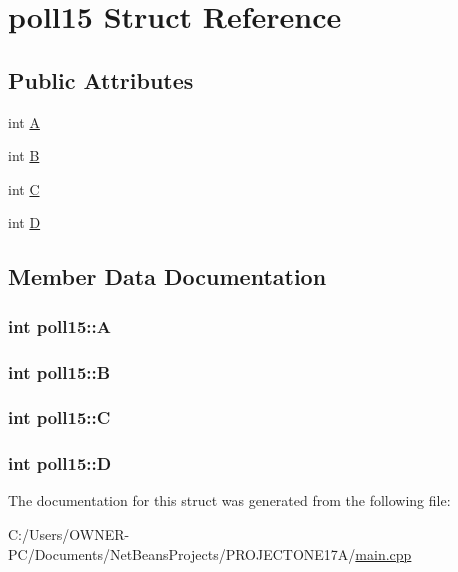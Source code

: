 \hypertarget{structpoll15}{\section{poll15 Struct Reference}
\label{structpoll15}
}
\subsection*{Public Attributes}
\begin{DoxyCompactItemize}
\item 
int \hyperlink{structpoll15_afdb28315d0d491657a2ec84be74b134f}{A}
\item 
int \hyperlink{structpoll15_a64d2ca7b5777950cc990f1be90099f97}{B}
\item 
int \hyperlink{structpoll15_a48a941327e68f8256c88a8a63f8e4632}{C}
\item 
int \hyperlink{structpoll15_a20b85e236d485c7014e6bc8bd4066d0b}{D}
\end{DoxyCompactItemize}


\subsection{Member Data Documentation}
\hypertarget{structpoll15_afdb28315d0d491657a2ec84be74b134f}{
\subsubsection[{A}]{\setlength{\rightskip}{0pt plus 5cm}int poll15\+::\+A}}\label{structpoll15_afdb28315d0d491657a2ec84be74b134f}
\hypertarget{structpoll15_a64d2ca7b5777950cc990f1be90099f97}{
\subsubsection[{B}]{\setlength{\rightskip}{0pt plus 5cm}int poll15\+::\+B}}\label{structpoll15_a64d2ca7b5777950cc990f1be90099f97}
\hypertarget{structpoll15_a48a941327e68f8256c88a8a63f8e4632}{
\subsubsection[{C}]{\setlength{\rightskip}{0pt plus 5cm}int poll15\+::\+C}}\label{structpoll15_a48a941327e68f8256c88a8a63f8e4632}
\hypertarget{structpoll15_a20b85e236d485c7014e6bc8bd4066d0b}{
\subsubsection[{D}]{\setlength{\rightskip}{0pt plus 5cm}int poll15\+::\+D}}\label{structpoll15_a20b85e236d485c7014e6bc8bd4066d0b}


The documentation for this struct was generated from the following file\+:\begin{DoxyCompactItemize}
\item 
C\+:/\+Users/\+O\+W\+N\+E\+R-\/\+P\+C/\+Documents/\+Net\+Beans\+Projects/\+P\+R\+O\+J\+E\+C\+T\+O\+N\+E17\+A/\hyperlink{main_8cpp}{main.\+cpp}\end{DoxyCompactItemize}
